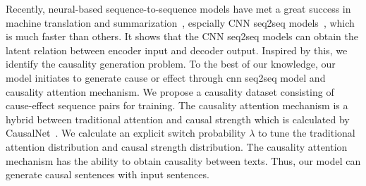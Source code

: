 Recently, neural-based sequence-to-sequence models have met a great success
in machine translation and summarization~\cite{BahdanauCB14,SutskeverVL14,PaulusXS17,SeeLM17,NallapatiZSGX16}, 
espcially CNN seq2seq models~\cite{gehring2017convs2s,LiuLZ18,FanGA18},
which is much faster than others.
It shows that the CNN seq2seq models can obtain the latent relation
between encoder input and decoder output. Inspired by this, we
identify the causality generation problem.
To the best of our knowledge,
our model initiates to generate cause or effect through cnn seq2seq model 
and causality attention mechanism. 
We propose a causality dataset consisting
of cause-effect sequence pairs for training.
The causality attention mechanism
is a hybrid between traditional attention and 
causal strength which is calculated by CausalNet~\cite{LuoSZHW16}.
We calculate an explicit switch probability $\lambda$
to tune the traditional attention distribution and causal strength distribution.
The causality attention mechanism has the ability to obtain causality between texts.
Thus, our model can generate causal sentences with input sentences.



